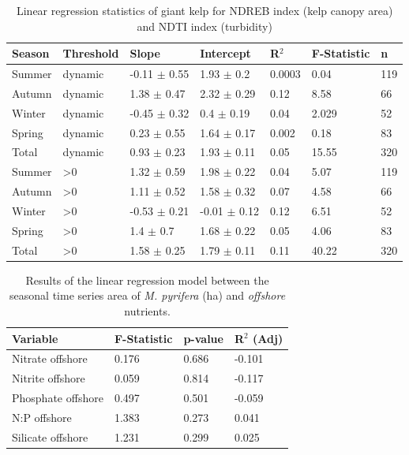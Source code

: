 \documentclass[a4paper,fleqn]{cas-sc}
\begin{document}
\begin{table}[width=.9\linewidth,cols=6,pos=!htbp]
\caption{Linear regression statistics of giant kelp for NDREB index (kelp canopy area) and NDTI index (turbidity)}
\small
\begin{tabular*}{\tblwidth}{@{} LLLLLLL@{} }
\toprule
Season & Threshold & Slope & Intercept & R$^{2}$ & F-Statistic & n\\
\midrule
Summer  & dynamic & -0.11 $\pm$ 0.55 & 1.93 $\pm$ 0.2 & 0.0003 & 0.04 & 119 \\
Autumn  & dynamic & 1.38 $\pm$ 0.47 & 2.32 $\pm$ 0.29 & 0.12 & 8.58 & 66 \\
Winter  & dynamic & -0.45 $\pm$ 0.32 & 0.4 $\pm$ 0.19 & 0.04 & 2.029 & 52 \\
Spring  & dynamic & 0.23 $\pm$ 0.55 & 1.64 $\pm$ 0.17 & 0.002 & 0.18 & 83 \\
Total  & dynamic & 0.93 $\pm$ 0.23 & 1.93 $\pm$ 0.11 & 0.05 & 15.55 & 320 \\
Summer  & >0 & 1.32 $\pm$ 0.59 & 1.98 $\pm$ 0.22 & 0.04 & 5.07 & 119 \\
Autumn  & >0 & 1.11 $\pm$ 0.52 & 1.58 $\pm$ 0.32 & 0.07 & 4.58 & 66 \\
Winter  & >0 & -0.53 $\pm$ 0.21 & -0.01 $\pm$ 0.12 & 0.12 & 6.51 & 52 \\
Spring  & >0 & 1.4 $\pm$ 0.7 & 1.68 $\pm$ 0.22 & 0.05 & 4.06 & 83 \\
Total  & >0 & 1.58 $\pm$ 0.25 & 1.79 $\pm$ 0.11 & 0.11 & 40.22 & 320 \\\bottomrule
\end{tabular*}
\label{tab:15}
\end{table}

\begin{table}[width=.9\linewidth,cols=4,pos=!htbp]
\caption{Results of the linear regression model between the seasonal time series area of \textit{M. pyrifera} (ha) and \textit{offshore} nutrients.}\label{nutrientoff}
\small
\begin{tabular*}{\tblwidth}{@{} LLLL@{} }
\toprule
Variable & F-Statistic & p-value & R$^{2}$ (Adj) \\
\midrule
Nitrate offshore & 0.176 & 0.686 & -0.101 \\
Nitrite offshore & 0.059 & 0.814 & -0.117 \\
Phosphate offshore & 0.497 & 0.501 & -0.059 \\
N:P offshore & 1.383 & 0.273 & 0.041 \\
Silicate offshore & 1.231 & 0.299 & 0.025 \\
\bottomrule
\end{tabular*}
\label{tab:16}
\end{table}
\end{document}
